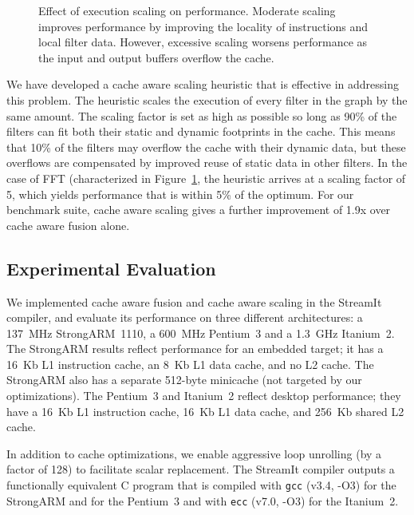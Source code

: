 \begin{figure}[t]
\centering
{}
\caption[Effect of execution scaling on performance.]{Effect of execution 
scaling on performance.  Moderate scaling improves performance by
improving the locality of instructions and local filter data.
However, excessive scaling worsens performance as the input and output
buffers overflow the cache.\protect\label{fig:scaling}}
\end{figure}

We have developed a cache aware scaling heuristic that is effective in
addressing this problem.  The heuristic scales the execution of every
filter in the graph by the same amount.  The scaling factor is set as
high as possible so long as 90\% of the filters can fit both their
static and dynamic footprints in the cache.  This means that 10\% of
the filters may overflow the cache with their dynamic data, but these
overflows are compensated by improved reuse of static data in other
filters.  In the case of FFT (characterized in
Figure~\ref{fig:scaling}, the heuristic arrives at a scaling factor of
5, which yields performance that is within 5\% of the optimum.  For our
benchmark suite, cache aware scaling gives a further improvement of
1.9x over cache aware fusion alone.

\subsection*{Experimental Evaluation}

We implemented cache aware fusion and cache aware scaling in the
StreamIt compiler, and evaluate its performance on three different
architectures: a 137~MHz StrongARM~1110, a 600~MHz Pentium~3 and a
1.3~GHz Itanium~2. The StrongARM results reflect performance for an
embedded target; it has a 16~Kb L1 instruction cache, an 8~Kb L1 data
cache, and no L2 cache.  The StrongARM also has a separate 512-byte
minicache (not targeted by our optimizations).  The Pentium~3 and
Itanium~2 reflect desktop performance; they have a 16~Kb L1
instruction cache, 16~Kb L1 data cache, and 256~Kb shared L2 cache.

In addition to cache optimizations, we enable aggressive loop
unrolling (by a factor of 128) to facilitate scalar replacement.  The
StreamIt compiler outputs a functionally equivalent C program that is
compiled with \texttt{gcc} (v3.4, -O3) for the StrongARM and for the
Pentium~3 and with \texttt{ecc} (v7.0, -O3) for the Itanium~2.

